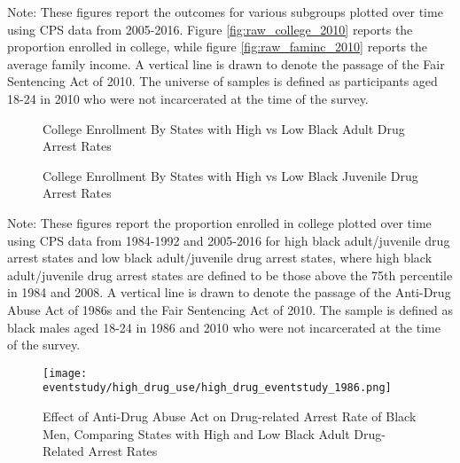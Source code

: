   \begin{footnotesize}
    \noindent Note: These figures report the outcomes for various subgroups plotted over time using CPS data from 2005-2016. Figure \ref{fig:raw_college_2010} reports the proportion enrolled in college, while figure \ref{fig:raw_faminc_2010} reports the average family income. A vertical line is drawn to denote the passage of the Fair Sentencing Act of 2010. The universe of samples is defined as participants aged 18-24 in 2010 who were not incarcerated at the time of the survey.
  \end{footnotesize}
  
  \clearpage
  
  \begin{figure}[h]
    \centering
    \caption{College Enrollment By States with High vs Low Black Adult Drug Arrest Rates}%
    \qquad
    \label{fig:raw_college_highlowab_1986}%
  \end{figure}
  \begin{figure}[h]
    \centering
    \caption{College Enrollment By States with High vs Low Black Juvenile Drug Arrest Rates}%
    \qquad
    \label{fig:raw_college_highlowjb_1986}%
  \end{figure}
  \begin{footnotesize}
    \noindent Note: These figures report the proportion enrolled in college plotted over time using CPS data from 1984-1992 and 2005-2016 for high black adult/juvenile drug arrest states and low black adult/juvenile drug arrest states, where high black adult/juvenile drug arrest states are defined to be those above the 75th percentile in 1984 and 2008. A vertical line is drawn to denote the passage of the Anti-Drug Abuse Act of 1986s and the Fair Sentencing Act of 2010. The sample is defined as black males aged 18-24 in 1986 and 2010 who were not incarcerated at the time of the survey.
  \end{footnotesize}
  
  \clearpage
  
  \begin{figure}[h]
    \caption{Effect of Anti-Drug Abuse Act on Drug-related Arrest Rate of Black Men, Comparing States with High and Low Black Adult Drug-Related Arrest Rates}
    \centering
    \texttt{[image: eventstudy/high\_drug\_use/high\_drug\_eventstudy\_1986.png]}
    \label{fig:ab_es_1986}
  \end{figure}
  
